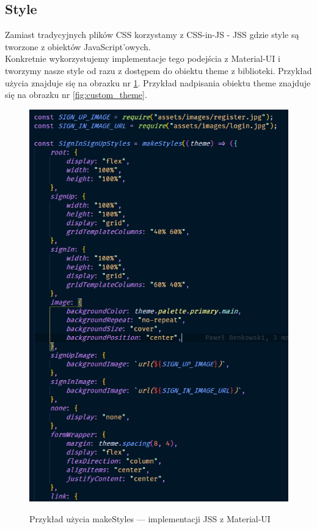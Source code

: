 \documentclass[a4paper,11pt]{report}
\begin{document}
\subsection{Style}
\label{subsec:style}
Zamiast tradycyjnych plików CSS korzystamy z CSS-in-JS - JSS gdzie style są tworzone z obiektów JavaScript'owych.\\
Konkretnie wykorzystujemy implementacje tego podejścia z Material-UI i tworzymy nasze style od razu z dostępem do obiektu theme z biblioteki.
Przykład użycia znajduje się na obrazku nr \ref{fig:jss_styles}.
Przykład nadpisania obiektu theme znajduje się na obrazku nr \ref{fig:custom_theme}.
\begin{figure}[H]
	\centering
	\includegraphics[scale=0.5]{implementacja/frontend/jss_styles}\\
	\caption{Przykład użycia makeStyles — implementacji JSS z Material-UI}
	\label{fig:jss_styles}
\end{figure}
\end{document}
